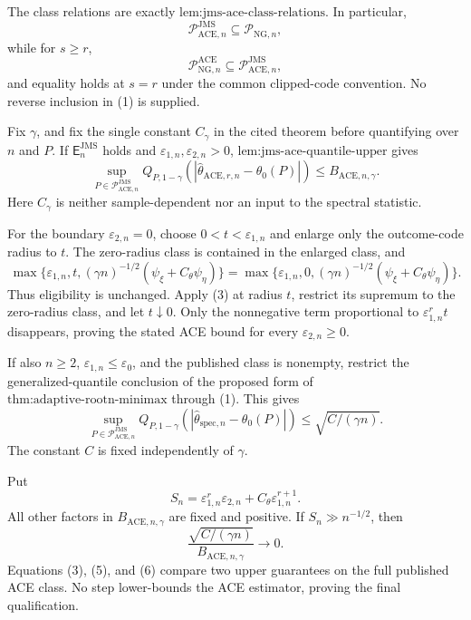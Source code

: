 The class relations are exactly \(\text{lem:jms-ace-class-relations}\).  In particular,
\[
 \mathcal P_{\mathrm{ACE},n}^{\mathrm{JMS}}
 \subseteq\mathcal P_{\mathrm{NG},n}, \tag{1}
\]
while for \(s\ge r\),
\[
 \mathcal P_{\mathrm{NG},n}^{\mathrm{ACE}}
 \subseteq\mathcal P_{\mathrm{ACE},n}^{\mathrm{JMS}}, \tag{2}
\]
and equality holds at \(s=r\) under the common clipped-code convention.  No reverse inclusion in (1) is supplied.

Fix \(\gamma\), and fix the single constant \(C_{\gamma}\) in the cited theorem before quantifying over \(n\) and \(P\).  If \(\mathsf E_n^{\mathrm{JMS}}\) holds and \(\varepsilon_{1,n},\varepsilon_{2,n}>0\), \(\text{lem:jms-ace-quantile-upper}\) gives
\[
 \sup_{P\in\mathcal P_{\mathrm{ACE},n}^{\mathrm{JMS}}}
 Q_{P,1-\gamma}
 (|\widehat\theta_{\mathrm{ACE},r,n}-\theta_0(P)|)
 \le B_{\mathrm{ACE},n,\gamma}. \tag{3}
\]
Here \(C_{\gamma}\) is neither sample-dependent nor an input to the spectral statistic.

For the boundary \(\varepsilon_{2,n}=0\), choose \(0<t<\varepsilon_{1,n}\) and enlarge only the outcome-code radius to \(t\).  The zero-radius class is contained in the enlarged class, and
\[
 \max\{\varepsilon_{1,n},t,
 (\gamma n)^{-1/2}(\psi_{\xi}+C_{\theta}\psi_{\eta})\}
 =
 \max\{\varepsilon_{1,n},0,
 (\gamma n)^{-1/2}(\psi_{\xi}+C_{\theta}\psi_{\eta})\}. \tag{4}
\]
Thus eligibility is unchanged.  Apply (3) at radius \(t\), restrict its supremum to the zero-radius class, and let \(t\downarrow0\).  Only the nonnegative term proportional to \(\varepsilon_{1,n}^rt\) disappears, proving the stated ACE bound for every \(\varepsilon_{2,n}\ge0\).

If also \(n\ge2\), \(\varepsilon_{1,n}\le\varepsilon_0\), and the published class is nonempty, restrict the generalized-quantile conclusion of the proposed form of \(\text{thm:adaptive-rootn-minimax}\) through (1).  This gives
\[
 \sup_{P\in\mathcal P_{\mathrm{ACE},n}^{\mathrm{JMS}}}
 Q_{P,1-\gamma}
 (|\widehat\theta_{\mathrm{spec},n}-\theta_0(P)|)
 \le\sqrt{C/(\gamma n)}. \tag{5}
\]
The constant \(C\) is fixed independently of \(\gamma\).

Put
\[
 S_n=\varepsilon_{1,n}^r\varepsilon_{2,n}
 +C_{\theta}\varepsilon_{1,n}^{r+1}.
\]
All other factors in \(B_{\mathrm{ACE},n,\gamma}\) are fixed and positive.  If \(S_n\gg n^{-1/2}\), then
\[
 \frac{\sqrt{C/(\gamma n)}}{B_{\mathrm{ACE},n,\gamma}}
 \longrightarrow0. \tag{6}
\]
Equations (3), (5), and (6) compare two upper guarantees on the full published ACE class.  No step lower-bounds the ACE estimator, proving the final qualification.